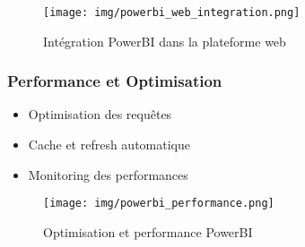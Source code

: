 \begin{figure}[H]
    \centering
    \texttt{[image: img/powerbi\_web\_integration.png]}
    \caption{Intégration PowerBI dans la plateforme web}
    \label{fig:powerbi_web_integration}
\end{figure}

\subsubsection{Performance et Optimisation}
\begin{itemize}
    \item Optimisation des requêtes
    \item Cache et refresh automatique
    \item Monitoring des performances
\end{itemize}

\begin{figure}[H]
    \centering
    \texttt{[image: img/powerbi\_performance.png]}
    \caption{Optimisation et performance PowerBI}
    \label{fig:powerbi_performance}
\end{figure}